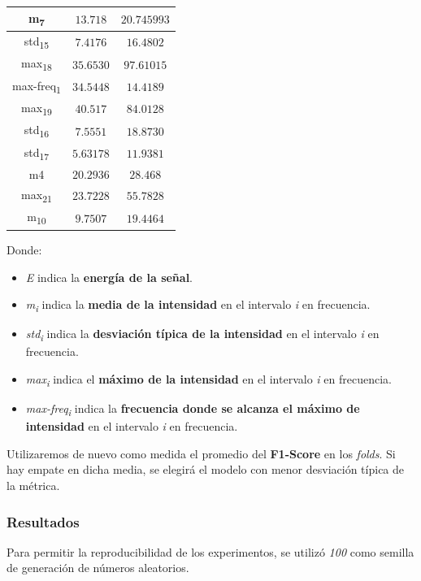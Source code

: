 \documentclass[12pt]{article}
\begin{document}
\begin{table}
\begin{tabular}{||c c c||}
			\hline
			m\textsubscript{7} & $13.718$ & $20.745993$ \\
			\hline
			std\textsubscript{15} & $7.4176$ & $16.4802$ \\
			\hline
			max\textsubscript{18} & $35.6530$ & $97.61015$ \\
			\hline
			max-freq\textsubscript{1} & $34.5448$ & $14.4189$ \\
			\hline
			max\textsubscript{19} & $40.517$ & $84.0128$ \\
			\hline
			std\textsubscript{16} & $7.5551$ & $18.8730$ \\
			\hline
			std\textsubscript{17} & $5.63178$ & $11.9381$ \\
			\hline
			m4 & $20.2936$ & $28.468$ \\
			\hline
			max\textsubscript{21} & $23.7228$ & $55.7828$ \\
			\hline
			m\textsubscript{10} & $9.7507$ & $19.4464$ \\
			\hline
		\end{tabular}
	\label{Tab:Features_5_3}
\end{table}

\newpage
\hphantom{skip}

Donde:
\begin{itemize}
	\item \textit{E} indica la \textbf{energía de la señal}.
	\item \textit{m\textsubscript{i}} indica la \textbf{media de la intensidad} en el intervalo \textit{i} en frecuencia.
	\item \textit{std\textsubscript{i}} indica la \textbf{desviación típica de la intensidad} en el intervalo \textit{i} en frecuencia.
	\item \textit{max\textsubscript{i}} indica el \textbf{máximo de la intensidad} en el intervalo \textit{i} en frecuencia.
	\item \textit{max-freq\textsubscript{i}} indica la \textbf{frecuencia donde se alcanza el máximo de intensidad} en el intervalo \textit{i} en frecuencia.
\end{itemize}

\bigskip
Utilizaremos de nuevo como medida el promedio del \textbf{F1-Score} en los \textit{folds}. Si hay empate en dicha media, se elegirá el modelo con menor
desviación típica de la métrica.

\subsubsection{Resultados}
Para permitir la reproducibilidad de los experimentos, se utilizó \textit{100} como semilla de generación de números
aleatorios.
\end{document}
